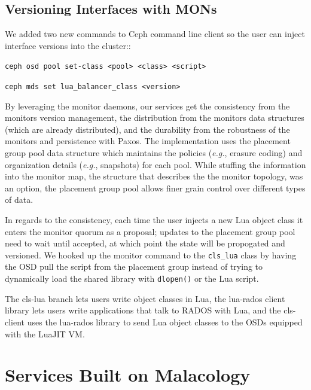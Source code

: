 \documentclass[10pt,twocolumn]{article}
\begin{document}
\subsection{Versioning Interfaces with
MONs}\label{versioning-interfaces-with-mons}

We added two new commands to Ceph command line client so the user can
inject interface versions into the cluster::

\noindent \texttt{ceph\ osd\ pool\ set-class\ \textless{}pool\textgreater{}\ \textless{}class\textgreater{}\ \textless{}script\textgreater{}}

\noindent \texttt{ceph\ mds\ set\ lua\_balancer\_class\ \textless{}version\textgreater{}}

By leveraging the monitor daemons, our services get the consistency from
the monitors version management, the distribution from the monitors data
structures (which are already distributed), and the durability from the
robustness of the monitors and persistence with Paxos. The
implementation uses the placement group pool data structure which
maintains the policies (\emph{e.g.}, erasure coding) and organization
details (\emph{e.g.}, snapshots) for each pool. While stuffing the
information into the monitor map, the structure that describes the the
monitor topology, was an option, the placement group pool allows finer
grain control over different types of data.

In regards to the consistency, each time the user injects a new Lua
object class it enters the monitor quorum as a proposal; updates to the
placement group pool need to wait until accepted, at which point the
state will be propogated and versioned. We hooked up the monitor command
to the \texttt{cls\_lua} class by having the OSD pull the script from
the placement group instead of trying to dynamically load the shared
library with \texttt{dlopen()} or the Lua script.

The cls-lua branch lets users write object classes in Lua, the lua-rados
client library lets users write applications that talk to RADOS with
Lua, and the cls-client uses the lua-rados library to send Lua object
classes to the OSDs equipped with the LuaJIT VM.


\section{Services Built on
Malacology}\label{services-built-on-malacology}

\label{services}
\end{document}

